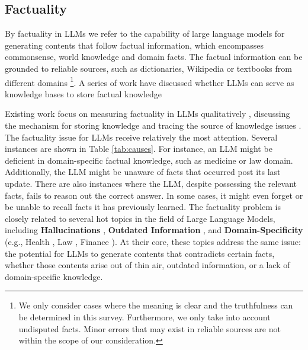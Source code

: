 




\subsection{Factuality}
\label{sec:definition}

By factuality in LLMs we refer to the capability of large language models for generating contents that follow factual information, which encompasses commonsense, world knowledge and domain facts. The factual information can be grounded to reliable sources, such as dictionaries, Wikipedia or textbooks from different domains \footnote{We only consider cases where the meaning is clear and the truthfulness can be determined in this survey. Furthermore, we only take into account undisputed facts. Minor errors that may exist in reliable sources are not within the scope of our consideration. }. A series of work have discussed whether LLMs can serve as knowledge bases to store factual knowledge \citep{alkhamissi2022review,yu2023generate,pan2023unifying}


Existing work focus on measuring factuality in LLMs qualitatively \citep{TruthfulQA,chern2023factool}, discussing the mechanism for storing knowledge \citep{meng2022locating,chen2023journey} and tracing the source of knowledge issues \citep{gou2023critic,kandpal2023large}. The factuality issue for LLMs receive relatively the most attention. Several instances are shown in Table \ref{tab:causes}. 
For instance, an LLM might be deficient in domain-specific factual knowledge, such as medicine or law domain. Additionally, the LLM might be unaware of facts that occurred post its last update. There are also instances where the LLM, despite possessing the relevant facts, fails to reason out the correct answer. In some cases, it might even forget or be unable to recall facts it has previously learned.
The factuality problem is closely related to several hot topics in the field of Large Language Models, including \textbf{Hallucinations} \citep{Hallucination_Survey,LLMSurvey}, \textbf{Outdated Information} \citep{WebGPT,WebCPM}, and \textbf{Domain-Specificity} (e.g., Health \citep{DoctorGLM,huatuo}, Law \citep{ChatLaw}, Finance \citep{BloombergGPT}). At their core, these topics address the same issue: the potential for LLMs to generate contents that contradicts certain facts, whether those contents arise out of thin air, outdated information, or a lack of domain-specific knowledge. %

